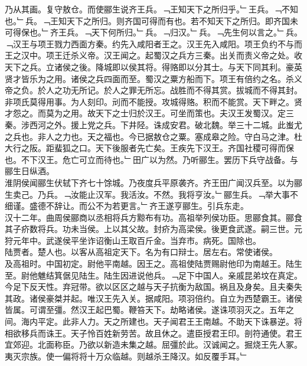 \documentclass{zhvt-classic}
\begin{document}
\hspace*{2em}乃从其画。复守敖仓。而使郦生说齐王兵。﹁王知天下之所归乎。﹂王兵。﹁不知也。﹂兵。﹁王知天下之所归。则齐国可得而有也。若不知天下之所归。即齐国未可得保也。﹂齐王兵。﹁天下何所归。﹂兵。﹁归汉。﹂兵。﹁先生何以言之。﹂兵。﹁汉王与项王戮力西面方秦。约先入咸阳者王之。汉王先入咸阳。项王负约不与而王之汉中。项王迁杀义帝。汉王闻之。起蜀汉之兵方三秦。出关而责义帝之处。收天下之兵。立诸侯之後。降城即以侯其将。得赂即以分其士。与天下同其利。豪英贤才皆乐为之用。诸侯之兵四面而至。蜀汉之粟方船而下。项王有倍约之名。杀义帝之负。於人之功无所记。於人之罪无所忘。战胜而不得其赏。拔城而不得其封。非项氏莫得用事。为人刻印。刓而不能授。攻城得赂。积而不能赏。天下畔之。贤才怨之。而莫为之用。故天下之士归於汉王。可坐而策也。夫汉王发蜀汉。定三秦。涉西河之外。援上党之兵。下井陉。诛成安君。破北魏。举三十二城。此蚩尤之兵也。非人之力也。天之福也。今已据敖仓之粟。塞成皋之险。守白马之津。杜大行之阪。距蜚狐之口。天下後服者先亡矣。王疾先下汉王。齐国社稷可得而保也。不下汉王。危亡可立而待也。﹂田广以为然。乃听郦生。罢历下兵守战备。与郦生日纵酒。\\
\hspace*{2em}淮阴侯闻郦生伏轼下齐七十馀城。乃夜度兵平原袭齐。齐王田广闻汉兵至。以为郦生卖己。乃兵。﹁汝能止汉军。我活汝。不然。我将亨汝。﹂郦生兵。﹁举大事不细谨。盛德不辞让。而公不为若更言。﹂齐王遂亨郦生。引兵东走。\\
\hspace*{2em}汉十二年。曲周侯郦商以丞相将兵方黥布有功。高祖举列侯功臣。思郦食其。郦食其子疥数将兵。功未当侯。上以其父故。封疥为高梁侯。後更食武遂。嗣三世。元狩元年中。武遂侯平坐诈诏衡山王取百斤金。当弃市。病死。国除也。\\
\hspace*{2em}陆贾者。楚人也。以客从高祖定天下。名为有口辩士。居左右。常使诸侯。\\
\hspace*{2em}及高祖时。中国初定。尉他平南越。因王之。高祖使陆贾赐尉他印为南越王。陆生至。尉他魋结箕倨见陆生。陆生因进说他兵。﹁足下中国人。亲戚昆弟坟在真定。今足下反天性。弃冠带。欲以区区之越与天子抗衡为敌国。祸且及身矣。且夫秦失其政。诸侯豪桀并起。唯汉王先入关。据咸阳。项羽倍约。自立为西楚霸王。诸侯皆属。可谓至彊。然汉王起巴蜀。鞭笞天下。劫略诸侯。遂诛项羽灭之。五年之间。海内平定。此非人力。天之所建也。天子闻君王王南越。不助天下诛暴逆。将相欲移兵而诛王。天子怜百姓新劳苦。故且休之。遣臣授君王印。剖符通使。君王宜郊迎。北面称臣。乃欲以新造未集之越。屈彊於此。汉诚闻之。掘烧王先人冢。夷灭宗族。使一偏将将十万众临越。则越杀王降汉。如反覆手耳。﹂\\
\end{document}
